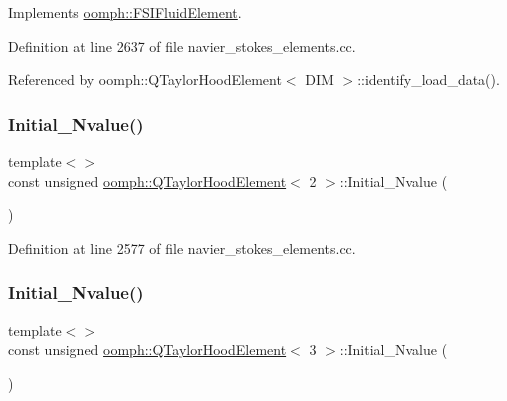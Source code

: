 Implements \hyperlink{classoomph_1_1FSIFluidElement_af8e0805b769b7d111eb71f223fc83df8}{oomph\+::\+F\+S\+I\+Fluid\+Element}.



Definition at line 2637 of file navier\+\_\+stokes\+\_\+elements.\+cc.



Referenced by oomph\+::\+Q\+Taylor\+Hood\+Element$<$ D\+I\+M $>$\+::identify\+\_\+load\+\_\+data().

\mbox{\label{classoomph_1_1QTaylorHoodElement_ac3a47114c0d730eebb15f513b3c420b6}} 
\subsubsection{\texorpdfstring{Initial\+\_\+\+Nvalue()}{Initial\_Nvalue()}\hspace{0.1cm}{\footnotesize\ttfamily [1/2]}}
{\footnotesize\ttfamily template$<$$>$ \\
const unsigned \hyperlink{classoomph_1_1QTaylorHoodElement}{oomph\+::\+Q\+Taylor\+Hood\+Element}$<$ 2 $>$\+::Initial\+\_\+\+Nvalue (\begin{DoxyParamCaption}{ }\end{DoxyParamCaption})\hspace{0.3cm}{\ttfamily [private]}}



Definition at line 2577 of file navier\+\_\+stokes\+\_\+elements.\+cc.

\mbox{\label{classoomph_1_1QTaylorHoodElement_a9e2986080ab54aec2bec9744ed52ad1d}} 
\subsubsection{\texorpdfstring{Initial\+\_\+\+Nvalue()}{Initial\_Nvalue()}\hspace{0.1cm}{\footnotesize\ttfamily [2/2]}}
{\footnotesize\ttfamily template$<$$>$ \\
const unsigned \hyperlink{classoomph_1_1QTaylorHoodElement}{oomph\+::\+Q\+Taylor\+Hood\+Element}$<$ 3 $>$\+::Initial\+\_\+\+Nvalue (\begin{DoxyParamCaption}{ }\end{DoxyParamCaption})\hspace{0.3cm}{\ttfamily [private]}}



